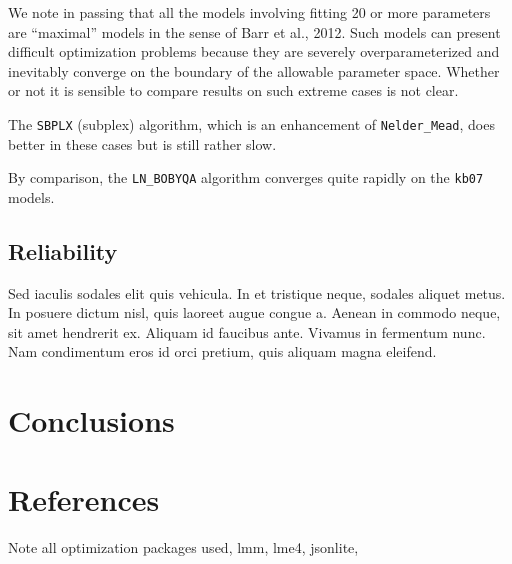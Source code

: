 \documentclass[article]{jss}
\begin{document}
We note in passing that all the models involving fitting 20 or more
parameters are ``maximal'' models in the sense of Barr et al., 2012.
Such models can present difficult optimization problems because they are
severely overparameterized and inevitably converge on the boundary of
the allowable parameter space. Whether or not it is sensible to compare
results on such extreme cases is not clear.

The \texttt{SBPLX} (subplex) algorithm, which is an enhancement of
\texttt{Nelder\_Mead}, does better in these cases but is still rather
slow.



  
    By comparison, the \texttt{LN\_BOBYQA} algorithm converges quite rapidly
on the \texttt{kb07} models.

        
        
        


\subsection[Reliablility]{Reliability}

 Sed iaculis sodales elit quis vehicula. In et tristique neque, sodales aliquet metus. In posuere dictum nisl, quis laoreet augue congue a. Aenean in commodo neque, sit amet hendrerit ex. Aliquam id faucibus ante. Vivamus in fermentum nunc. Nam condimentum eros id orci pretium, quis aliquam magna eleifend. 

\section[Conclusions]{Conclusions}

\section[References]{References}

Note all optimization packages used, lmm, lme4, jsonlite, 
\end{document}
